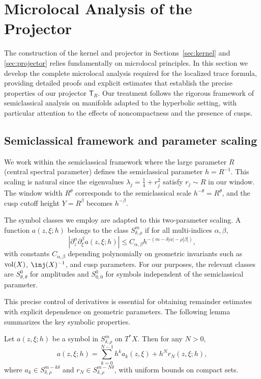 \section{Microlocal Analysis of the Projector}\label{sec:microlocal}

The construction of the kernel and projector in Sections~\ref{sec:kernel} and \ref{sec:projector} relies fundamentally on microlocal principles. In this section we develop the complete microlocal analysis required for the localized trace formula, providing detailed proofs and explicit estimates that establish the precise properties of our projector $\mathsf{T}_R$. Our treatment follows the rigorous framework of semiclassical analysis on manifolds \cite{zworski2012,dyatlov2019} adapted to the hyperbolic setting, with particular attention to the effects of noncompactness and the presence of cusps.

\subsection{Semiclassical framework and parameter scaling}\label{subsec:micro-semiclassical}

We work within the semiclassical framework where the large parameter $R$ (central spectral parameter) defines the semiclassical parameter $h = R^{-1}$. This scaling is natural since the eigenvalues $\lambda_j = \tfrac{1}{4} + r_j^2$ satisfy $r_j \sim R$ in our window. The window width $R^\theta$ corresponds to the semiclassical scale $h^{-\theta} = R^\theta$, and the cusp cutoff height $Y = R^\beta$ becomes $h^{-\beta}$.

The symbol classes we employ are adapted to this two-parameter scaling. A function $a(z,\xi;h)$ belongs to the class $S^m_{\delta,\rho}$ if for all multi-indices $\alpha, \beta$,
\[
|\partial_z^\alpha \partial_\xi^\beta a(z,\xi;h)| \leq C_{\alpha,\beta} h^{-(m - \delta|\alpha| - \rho|\beta|)},
\]
with constants $C_{\alpha,\beta}$ depending polynomially on geometric invariants such as $\operatorname{vol}(X)$, $\inj(X)^{-1}$, and cusp parameters. For our purposes, the relevant classes are $S^0_{\theta,\theta}$ for amplitudes and $S^0_{0,0}$ for symbols independent of the semiclassical parameter.

This precise control of derivatives is essential for obtaining remainder estimates with explicit dependence on geometric parameters. The following lemma summarizes the key symbolic properties.

\begin{lemma}\label{lem:symbol-bounds}
Let $a(z,\xi;h)$ be a symbol in $S^m_{\delta,\rho}$ on $T^*X$. Then for any $N > 0$,
\[
a(z,\xi;h) = \sum_{k=0}^{N-1} h^k a_k(z,\xi) + h^N r_N(z,\xi;h),
\]
where $a_k \in S^{m-k\delta}_{\delta,\rho}$ and $r_N \in S^{m-N\delta}_{\delta,\rho}$, with uniform bounds on compact sets.
\end{lemma}

